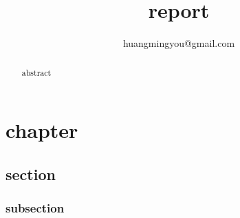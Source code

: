 \documentclass[12pt,a4paper]{report}
\begin{document}
\fzsk
\title{\msyh report}
\author{huangmingyou@gmail.com}

\maketitle
\renewcommand{\contentsname}{目录}


%
\begin{abstract}
abstract
\end{abstract}
\chapter{\msyh chapter}
\section{\msyh section}
\subsection{\msyh subsection}
\end{document}
